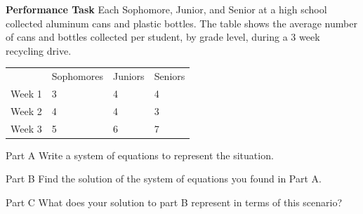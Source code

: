\documentclass{article}
\newenvironment{practice}[2]{}{}        %
\newcommand{\answer}[1]{}               %
\newcommand{\placeholder}[2]{}          %
\newcommand{\te}[1]{}                   %
\begin{document}
\begin{practice}{37}{2}
\textbf{Performance Task} Each Sophomore, Junior, and Senior at a high school collected aluminum cans and plastic bottles. The table shows the average number of cans and bottles collected per student, by grade level, during a 3 week recycling drive.
\placeholder{illustration}{Three recycling bins filled with cans and bottles: left blue Week 1, 2,319 cans and bottles; center green Week 3, 3,785 cans and bottles; right red Week 2, 2,290 cans and bottles. Recycling symbols near bin bottoms.}
\begin{tabular}{llll}
 & Sophomores & Juniors & Seniors \\
Week 1 & 3 & 4 & 4 \\
Week 2 & 4 & 4 & 3 \\
Week 3 & 5 & 6 & 7 \\
\end{tabular}
Part A Write a system of equations to represent the situation.
\answer{Assume that at each game there are the same number of sophomores, juniors, and seniors. (\begin{cases}3x+4y+4z=2319\\4x+4y+3z=2290\\5x+6y+7z=3785\end{cases})}
\te{Printed answer says at each game although the prompt describes a recycling drive; likely each week.}
Part B Find the solution of the system of equations you found in Part A.
\answer{(x=185), (y=227), (z=214)}
Part C What does your solution to part B represent in terms of this scenario?
\answer{There are 185 sophomores, 227 juniors, and 214 seniors at the high school.}
\end{practice}
\end{document}
